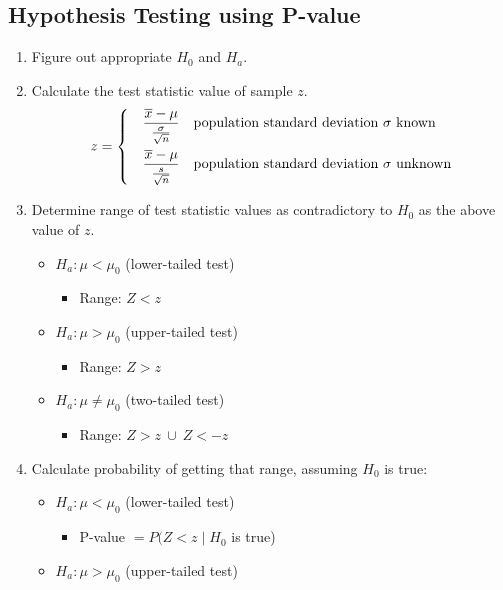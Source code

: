 \documentclass[a4paper]{article}
\begin{document}
\subsection{Hypothesis Testing using P-value}
\begin{enumerate}
    \item Figure out appropriate $H_{0}$ and $H_{a}$.
    \item Calculate the test statistic value of sample $z$.
    $$
     z =
    \begin{dcases}
    \quad \frac{\overline{x}-\mu}{\frac{\sigma}{\sqrt{n}}} &\mbox{population standard deviation $\sigma$ known}\\
    \quad \frac{\overline{x}-\mu}{\frac{s}{\sqrt{n}}} &\mbox{population standard deviation $\sigma$ unknown}
    \end{dcases}
    $$
    \item Determine range of test statistic values as contradictory to $H_{0}$ as the above value of $z$.
    \begin{itemize}
        \item $H_{a}: \mu < \mu_{0}$ (lower-tailed test)
        \begin{itemize}[label=$\circ$]
            \item Range: $Z < z$
        \end{itemize}
        \item $H_{a}: \mu > \mu_{0}$ (upper-tailed test)
        \begin{itemize}[label=$\circ$]
            \item Range: $Z > z$
        \end{itemize}
        \item $H_{a}: \mu \neq \mu_{0}$ (two-tailed test)
        \begin{itemize}[label=$\circ$]
            \item Range: $Z > z \ \cup  \ Z < -z$
        \end{itemize}
    \end{itemize}
    \item Calculate probability of getting that range, assuming $H_{0}$ is true:
    \begin{itemize}
        \item $H_{a}: \mu < \mu_{0}$ (lower-tailed test)
        \begin{itemize}[label=$\circ$]
            \item P-value $= P(Z < z\mid H_{0}$ is true)
        \end{itemize}
        \item $H_{a}: \mu > \mu_{0}$ (upper-tailed test)

\end{itemize}
\end{enumerate}
\end{document}
